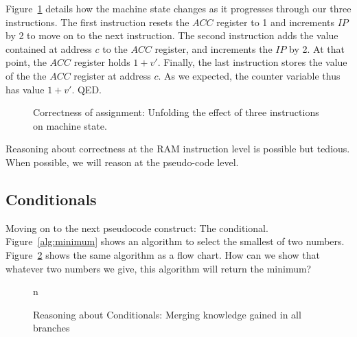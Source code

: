 \documentclass{aldast}
\begin{document}
Figure~\ref{fig:assignment} details how the machine state changes as
it progresses through our three instructions. The first instruction
resets the $\mathit{ACC}$ register to 1 and increments $\mathit{IP}$
by 2 to move on to the next instruction. The second instruction adds
the value contained at address $c$ to the $\mathit{ACC}$ register, and
increments the $\mathit{IP}$ by 2. At that point, the $\mathit{ACC}$
register holds $1 + v'$. Finally, the last instruction stores the
value of the the $\mathit{ACC}$ register at address $c$. As we
expected, the counter variable thus has value $1+v'$. QED.

\begin{figure}[htbp]
  \begin{center}
    
  \end{center}
  \caption{Correctness of assignment: Unfolding the effect of three
    instructions on machine state.}
  \label{fig:assignment}
\end{figure}

\begin{takeaway}
  Reasoning about correctness at the RAM instruction level is possible
  but tedious. When possible, we will reason at the pseudo-code level.
\end{takeaway}

\subsection{Conditionals}
Moving on to the next pseudocode construct: The
conditional. Figure~\ref{alg:minimum} shows an algorithm to select the
smallest of two numbers. Figure~\ref{fig:minimum} shows the same
algorithm as a flow chart. How can we show that whatever two numbers
we give, this algorithm will return the minimum?

\begin{figure}[htbp]
  \begin{center}
    
  \end{center}
  \caption{Reasoning about Conditionals: Merging knowledge gained in all branches}
  \label{fig:minimum}n
\end{figure}
\end{document}
